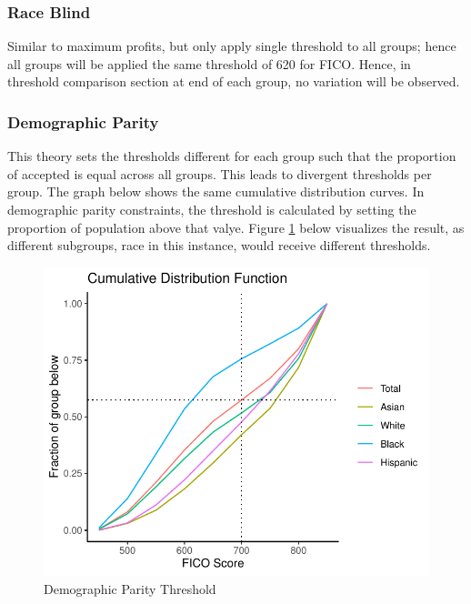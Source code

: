 \documentclass[11pt,]{article}
\begin{document}
\hypertarget{race-blind}{%
\subsubsection{Race Blind}\label{race-blind}}

Similar to maximum profits, but only apply single threshold to all
groups; hence all groups will be applied the same threshold of 620 for
FICO. Hence, in threshold comparison section at end of each group, no
variation will be observed.

\hypertarget{demographic-parity}{%
\subsubsection{Demographic Parity}\label{demographic-parity}}

This theory sets the thresholds different for each group such that the
proportion of accepted is equal across all groups. This leads to
divergent thresholds per group. The graph below shows the same
cumulative distribution curves. In demographic parity constraints, the
threshold is calculated by setting the proportion of population above
that valye. Figure \ref{fig:demparity} below visualizes the result, as
different subgroups, race in this instance, would receive different
thresholds.

\begin{figure}
\centering
\includegraphics{figs/demparity.pdf}
\caption{\label{fig:demparity}Demographic Parity Threshold}
\end{figure}
\end{document}
